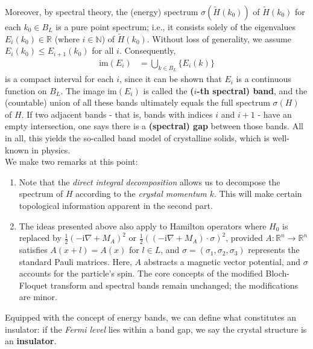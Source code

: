 Moreover, by spectral theory, the (energy) spectrum $\sigma(\tilde{H}(k_{0}))$ of $\tilde{H}(k_{0})$ for each $k_{0} \in B_{L}$ is a pure point spectrum; i.e., it consists solely of the eigenvalues $E_{i}(k_{0}) \in \mathbb{R}$ (where $i \in \mathbb{N}$) of $\tilde{H}(k_{0})$.
Without loss of generality, we assume $E_{i}(k_{0}) \leq E_{i+1}(k_{0})$ for all $i$.
Consequently,
\begin{align*}
  \mathrm{im}(E_{i})
  &=
  \bigcup_{k \in B_{L}}\lbrace E_{i}(k) \rbrace
\end{align*}
is a compact interval for each $i$, since it can be shown that $E_{i}$ is a continuous function on $B_{L}$.
The image $\mathrm{im}(E_{i})$ is called the \textbf{($i$-th spectral) band}, and the (countable) union of all these bands ultimately equals the full spectrum $\sigma(H)$ of $H$.
If two adjacent bands - that is, bands with indices $i$ and $i+1$ - have an empty intersection, one says there is a \textbf{(spectral) gap} between those bands.
All in all, this yields the so-called band model of crystalline solids, which is well-known in physics.
\\
We make two remarks at this point:
\begin{enumerate}
\item
  Note that the \textit{direct integral decomposition} allows us to decompose the spectrum of $H$ according to the \textit{crystal momentum $k$}.
This will make certain topological information apparent in the second part.
\item
  The ideas presented above also apply to Hamilton operators where $H_{0}$ is replaced by $\frac{1}{2}(-\mathrm{i}\nabla + M_{A})^{2}$ or $\frac{1}{2}((-\mathrm{i}\nabla + M_{A}) \cdot \sigma)^{2}$, provided $A \colon \mathbb{R}^{n} \to \mathbb{R}^{n}$ satisfies $A(x + l) = A(x)$ for $l \in L$, and $\sigma = (\sigma_{1},\sigma_{2},\sigma_{3})$ represents the standard Pauli matrices.
Here, $A$ abstracts a magnetic vector potential, and $\sigma$ accounts for the particle's spin.
The core concepts of the modified Bloch-Floquet transform and spectral bands remain unchanged; the modifications are minor.
\end{enumerate}
Equipped with the concept of energy bands, we can define what constitutes an insulator: if the \textit{Fermi level} lies within a band gap, we say the crystal structure is an \textbf{insulator}.
